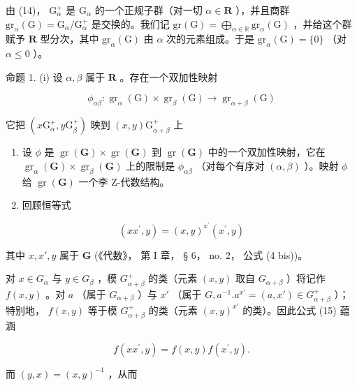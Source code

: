 由 (14)， \(\mathrm{G}_{\alpha}^{+}\) 是 \(\mathrm{G}_{\alpha}\) 的一个正规子群（对一切 \(\alpha \in \mathbf{R}\) ），并且商群 \(\mathrm{gr}_{\alpha}(\mathrm{G}) = \mathrm{G}_{\alpha} / \mathrm{G}_{\alpha}^{+}\) 是交换的。我们记 \(\mathrm{gr}(\mathrm{G}) = \bigoplus_{\alpha \in \mathbb{R}}\mathrm{gr}_{\alpha}(\mathrm{G})\) ，并给这个群赋予 \(\mathbf{R}\) 型分次，其中 \(\mathrm{gr}_{\alpha}(\mathrm{G})\) 由 \(\alpha\) 次的元素组成。于是 \(\mathrm{gr}_{\alpha}(\mathrm{G}) = \{0\}\) （对 \(\alpha \leqslant 0\) ）。

命题 1. (i) 设 \(\alpha, \beta\) 属于 \(\mathbf{R}\) 。存在一个双加性映射

\[
\phi_ {\alpha \beta}: \operatorname{gr} _ {\alpha} (\mathrm{G}) \times \operatorname{gr} _ {\beta} (\mathrm{G}) \rightarrow \operatorname{gr} _ {\alpha + \beta} (\mathrm{G})
\]

它把 \((x\mathrm{G}_{\alpha}^{+},y\mathrm{G}_{\beta}^{+})\) 映到 \((x,y)\mathrm{G}_{\alpha +\beta}^{+}\) 上

\begin{enumerate}
\def\labelenumi{(\roman{enumi})}
\setcounter{enumi}{1}
\item
  设 \(\phi\) 是 \(\operatorname{gr}(\mathbf{G}) \times \operatorname{gr}(\mathbf{G})\) 到 \(\operatorname{gr}(\mathbf{G})\) 中的一个双加性映射，它在 \(\operatorname{gr}_{\alpha}(\mathbf{G}) \times \operatorname{gr}_{\beta}(\mathbf{G})\) 上的限制是 \(\phi_{\alpha \beta}\) （对每个有序对 \((\alpha, \beta)\) ）。映射 \(\phi\) 给 \(\operatorname{gr}(\mathbf{G})\) 一个李 Z-代数结构。
\item
  回顾恒等式
\end{enumerate}

\[
(x x ^ {\prime}, y) = (x, y) ^ {x ^ {\prime}} \left(x ^ {\prime}, y\right)\tag{15}
\]

其中 \(x, x', y\) 属于 \(\mathbf{G}\) (《代数》， 第 I 章， § 6， no. 2， 公式 (4 bis))。

对 \(x \in G_{\alpha}\) 与 \(y \in G_{\beta}\) ，模 \(G_{\alpha + \beta}^{+}\) 的类（元素 \((x, y)\) 取自 \(G_{\alpha + \beta}\) ）将记作 \(f(x, y)\) 。对 \(a\) （属于 \(G_{\alpha + \beta}\) ）与 \(x'\) （属于 \(G, a^{-1}.a^{x'} = (a, x') \in G_{\alpha + \beta}^{+}\) ）；特别地， \(f(x, y)\) 等于模 \(G_{\alpha + \beta}^{+}\) 的类（元素 \((x, y)^{x'}\) 的类）。因此公式 (15) 蕴涵

\[
f (x x ^ {\prime}, y) = f (x, y) f (x ^ {\prime}, y).\tag{16}
\]

而 \((y, x) = (x, y)^{-1}\) ，从而

